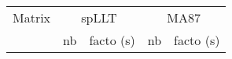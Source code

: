 \begin{tabular}{l|rr|rr}
  \hline
  Matrix                          & \multicolumn{2}{c}{spLLT} & \multicolumn{2}{c}{MA87}     \\
  \cline{2-5}
                                  & nb                        & facto (s) & nb  & facto (s)  \\
  \hline
  
  \hline
\end{tabular}
